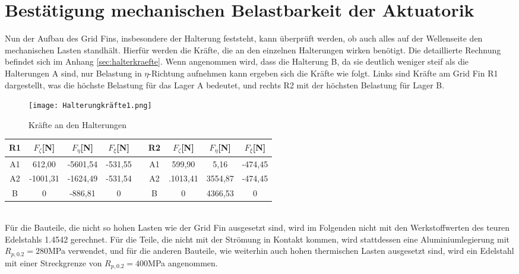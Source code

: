 \section{Bestätigung mechanischen Belastbarkeit der Aktuatorik}
Nun der Aufbau des Grid Fins, insbesondere der Halterung feststeht, kann überprüft werden, ob auch alles auf der Wellenseite den mechanischen Lasten standhält. Hierfür werden die Kräfte, die an den einzelnen Halterungen wirken benötigt. Die detaillierte Rechnung befindet sich im Anhang \ref{sec:halterkraefte}. Wenn angenommen wird, dass die Halterung B, da sie deutlich weniger steif als die Halterungen A sind, nur Belastung in $\eta$-Richtung aufnehmen kann ergeben sich die Kräfte wie folgt. Links sind Kräfte am Grid Fin R1 dargestellt, was die höchste Belastung für das Lager A bedeutet, und rechts R2 mit der höchsten Belastung für Lager B.
\begin{figure}[h] 
	\centering
	\texttt{[image: Halterungkräfte1.png]}
	\caption{Kräfte an den Halterungen}
\end{figure}
\begin{table}[h] 
	\centering 
	\begin{tabular}{c|c|c|cc||c|c|c|c} 
		\textbf{R1}&$F_{\zeta}$[N]&$F_\eta$[N]&$F_\xi$[N]&&\textbf{R2}&$F_{\zeta}$[N]&$F_\eta$[N]&$F_\xi$[N]\\ 
		\hline 
		A1& 612,00&-5601,54&-531,55&&A1&599,90&5,16&-474,45\\
		A2&-1001,31&-1624,49&-531,54&&A2&.1013,41&3554,87&-474,45\\
		B&0&-886,81&0&&B&0&4366,53&0\\
	\end{tabular}
\end{table} \\
Für die Bauteile, die nicht so hohen Lasten wie der Grid Fin ausgesetzt sind, wird im Folgenden nicht mit den Werkstoffwerten des teuren Edelstahls 1.4542 gerechnet. Für die Teile, die nicht mit der Strömung in Kontakt kommen, wird stattdessen eine Aluminiumlegierung mit $R_{p,0.2} = 280$MPa verwendet, und für die anderen Bauteile, wie weiterhin auch hohen thermischen Lasten ausgesetzt sind, wird ein Edelstahl mit einer Streckgrenze von $R_{p,0.2} = 400$MPa angenommen.
